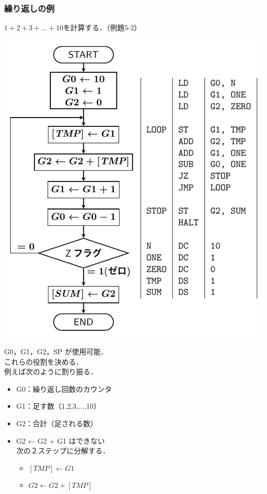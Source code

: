 \documentclass[handout]{beamer}        %
\begin{document}
\begin{frame}
  \frametitle{繰り返しの例}
  $1 + 2 + 3 + ... + 10$を計算する．（例題5-2）\\
  \vfill
  \begin{minipage}{0.47\columnwidth}
    \centerline{\includegraphics[scale=0.55]{../Tikz/flow3.pdf}}
  \end{minipage}
  \begin{minipage}{0.52\columnwidth}
    {\ttfamily
      G0，G1，G2，SP が使用可能．\\
      これらの役割を決める．\\
      例えば次のように割り振る．
      \begin{itemize}
      \item G0：繰り返し回数のカウンタ
      \item G1：足す数（1,2,3,...,10）
      \item G2：合計（足される数）
      \item G2 ← G2 + G1 はできない \\
        次の２ステップに分解する．
        \begin{itemize}
          \item $[TMP] ← G1$
          \item $G2 ←G2 + [TMP]$
        \end{itemize}
      \end{itemize}
    }
  \end{minipage}
  \vfill
\end{frame}
\end{document}
